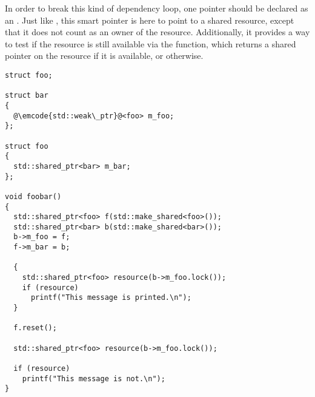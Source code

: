 In order to break this kind of dependency loop, one pointer should be
declared as an . Just like
, this smart pointer is here to point to a
shared resource, except that it does not count as an owner of the
resource. Additionally, it provides a way to test if the resource is
still available via the  function, which
returns a shared pointer on the resource if it is available, or
 otherwise.

\begin{lstlisting}
struct foo;

struct bar
{
  @\emcode{std::weak\_ptr}@<foo> m_foo;
};

struct foo
{
  std::shared_ptr<bar> m_bar;
};

void foobar()
{
  std::shared_ptr<foo> f(std::make_shared<foo>());
  std::shared_ptr<bar> b(std::make_shared<bar>());
  b->m_foo = f;
  f->m_bar = b;

  {
    std::shared_ptr<foo> resource(b->m_foo.lock());
    if (resource)
      printf("This message is printed.\n");
  }

  f.reset();

  std::shared_ptr<foo> resource(b->m_foo.lock());

  if (resource)
    printf("This message is not.\n");
}
\end{lstlisting}
